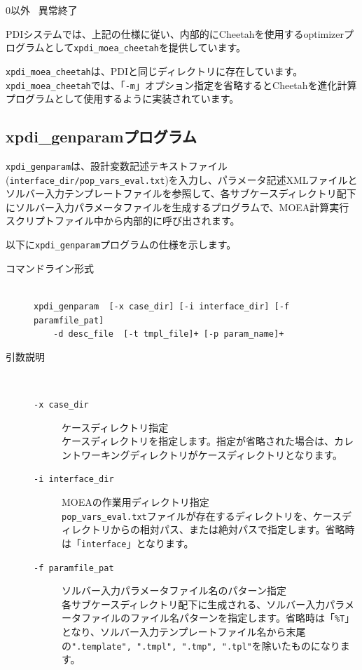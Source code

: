 \documentclass[a4paper,11pt]{jarticle}
\begin{document}
{\begin{description}
0以外 \ 異常終了
\end{description}

PDIシステムでは、上記の仕様に従い、内部的にCheetahを使用するoptimizerプログラムとして{\tt xpdi\_moea\_cheetah}を提供しています。

{\tt xpdi\_moea\_cheetah}は、PDIと同じディレクトリに存在しています。
{\tt xpdi\_moea\_cheetah}では、「{\tt -m}」オプション指定を省略するとCheetahを進化計算プログラムとして使用するように実装されています。


\newpage
\subsection{xpdi\_genparamプログラム}

{\tt xpdi\_genparam}は、設計変数記述テキストファイル({\tt interface\_dir/pop\_vars\_eval.txt})を入力し、パラメータ記述XMLファイルとソルバー入力テンプレートファイルを参照して、各サブケースディレクトリ配下にソルバー入力パラメータファイルを生成するプログラムで、MOEA計算実行スクリプトファイル中から内部的に呼び出されます。

以下に{\tt xpdi\_genparam}プログラムの仕様を示します。

\begin{description}
\item[コマンドライン形式] {\ }\\
{\tt xpdi\_genparam \ [-x case\_dir] [-i interface\_dir] [-f paramfile\_pat]}\\
\ \ \ \ {\tt -d desc\_file \ [-t tmpl\_file]+ [-p param\_name]+}


\item[引数説明] {\ }\par
\begin{description}
\item[{\tt -x  case\_dir}] ケースディレクトリ指定\\
ケースディレクトリを指定します。指定が省略された場合は、カレントワーキングディレクトリがケースディレクトリとなります。\\

\item[{\tt -i  interface\_dir}] MOEAの作業用ディレクトリ指定\\
{\tt pop\_vars\_eval.txt}ファイルが存在するディレクトリを、ケースディレクトリからの相対パス、または絶対パスで指定します。省略時は「{\tt interface}」となります。\\

\item[{\tt -f  paramfile\_pat}] ソルバー入力パラメータファイル名のパターン指定\\
各サブケースディレクトリ配下に生成される、ソルバー入力パラメータファイルのファイル名パターンを指定します。省略時は「{\tt \%T}」となり、ソルバー入力テンプレートファイル名から末尾の{\tt ".template", ".tmpl", ".tmp", ".tpl"}を除いたものになります。


\end{description}
\end{description}}
\end{document}
